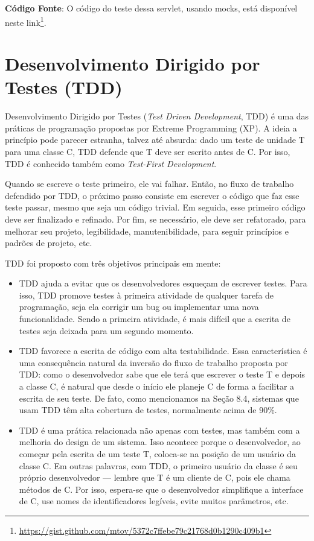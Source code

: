 \documentclass[
  11pt,
  twoside]{book}
\DeclareRobustCommand{\href}[2]{#2\footnote{\url{#1}}}
\begin{document}
\textbf{Código Fonte}: O código do teste dessa servlet, usando mocks,
está disponível neste
\href{https://gist.github.com/mtov/5372c7ffebe79c21768d0b1290c409b1}{link}.

\hypertarget{desenvolvimento-dirigido-por-testes-tdd}{%
\section{Desenvolvimento Dirigido por Testes
(TDD)}\label{desenvolvimento-dirigido-por-testes-tdd}}


Desenvolvimento Dirigido por Testes (\emph{Test Driven Development},
TDD) é uma das práticas de programação propostas por Extreme Programming
(XP). A ideia a princípio pode parecer estranha, talvez até absurda:
dado um teste de unidade T para uma classe C, TDD defende que T deve ser
escrito antes de C. Por isso, TDD é conhecido também como
\emph{Test-First Development}.

Quando se escreve o teste primeiro, ele vai falhar. Então, no fluxo de
trabalho defendido por TDD, o próximo passo consiste em escrever o
código que faz esse teste passar, mesmo que seja um código trivial. Em
seguida, esse primeiro código deve ser finalizado e refinado. Por fim,
se necessário, ele deve ser refatorado, para melhorar seu projeto,
legibilidade, manutenibilidade, para seguir princípios e padrões de
projeto, etc.

TDD foi proposto com três objetivos principais em mente:

\begin{itemize}
\item
  TDD ajuda a evitar que os desenvolvedores esqueçam de escrever testes.
  Para isso, TDD promove testes à primeira atividade de qualquer tarefa
  de programação, seja ela corrigir um bug ou implementar uma nova
  funcionalidade. Sendo a primeira atividade, é mais difícil que a
  escrita de testes seja deixada para um segundo momento.
\item
  TDD favorece a escrita de código com alta testabilidade. Essa
  característica é uma consequência natural da inversão do fluxo de
  trabalho proposta por TDD: como o desenvolvedor sabe que ele terá que
  escrever o teste T e depois a classe C, é natural que desde o início
  ele planeje C de forma a facilitar a escrita de seu teste. De fato,
  como mencionamos na Seção 8.4, sistemas que usam TDD têm alta
  cobertura de testes, normalmente acima de 90\%.
\item
  TDD é uma prática relacionada não apenas com testes, mas também com a
  melhoria do design de um sistema. Isso acontece porque o
  desenvolvedor, ao começar pela escrita de um teste T, coloca-se na
  posição de um usuário da classe C. Em outras palavras, com TDD, o
  primeiro usuário da classe é seu próprio desenvolvedor --- lembre que
  T é um cliente de C, pois ele chama métodos de C. Por isso, espera-se
  que o desenvolvedor simplifique a interface de C, use nomes de
  identificadores legíveis, evite muitos parâmetros, etc.
\end{itemize}
\end{document}
